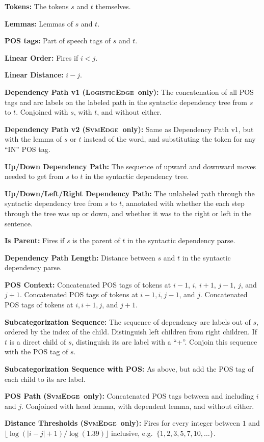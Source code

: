 \documentclass[11pt]{article}
\newcommand{\logitedge}{\textsc{LogisticEdge}}
\newcommand{\svmedge}{\textsc{SvmEdge}}
\begin{document}
\renewcommand{\floatpagefraction}{0.8}
\begin{table}
\begin{framed}
\begin{small}

\textbf{Tokens:} The tokens $s$ and $t$ themselves.

\textbf{Lemmas:} Lemmas of $s$ and $t$.

\textbf{POS tags:} Part of speech tags of $s$ and $t$.

\textbf{Linear Order:} Fires if $i < j$.

\textbf{Linear Distance:} $i - j$.

\textbf{Dependency Path v1 (\logitedge~only):} The concatenation of all POS
tags and arc labels on the labeled path in the syntactic dependency tree from $s$ to
$t$.  Conjoined with $s$, with $t$, and without either.

\textbf{Dependency Path v2 (\svmedge~only):}
Same as Dependency Path v1, but with the lemma of $s$ or $t$ instead of the
word, and substituting the token for any ``IN'' POS tag.

\textbf{Up/Down Dependency Path:} The sequence of upward and
	downward moves needed to get from $s$ to $t$ in the syntactic dependency
	tree.

\textbf{Up/Down/Left/Right Dependency Path:} The unlabeled path through
	the syntactic dependency tree from $s$ to $t$, annotated with whether the each
	step through the tree was up or down, and whether it was to the right or left
	in the sentence.

\textbf{Is Parent:} Fires if  $s$ is the parent of $t$ in the syntactic
	dependency parse.

\textbf{Dependency Path Length:} Distance between $s$ and $t$ in the
	syntactic dependency parse.

\textbf{POS Context:} Concatenated POS tags of tokens at $i-1$, $i$,
	$i+1$, $j-1$, $j$, and $j+1$. Concatenated POS tags of tokens at $i-1, i, j-1$,
	and $j$. Concatenated POS tags of tokens at $i, i+1, j$, and $j+1$.

\textbf{Subcategorization Sequence:} 
	The sequence of dependency arc labels out of $s$, ordered by the index of the
	child.
	Distinguish left children from right children.
	If $t$ is a direct child of $s$, distinguish its arc label with a ``+''.
	Conjoin this sequence with the POS tag of $s$.

\textbf{Subcategorization Sequence with POS:} As above, but add the
	POS tag of each child to its arc label.

\textbf{POS Path (\svmedge~only):}
Concatenated POS tags between and including $i$ and $j$.
Conjoined with head lemma, with dependent lemma, and without either.


\textbf{Distance Thresholds (\svmedge~only):}
Fires for every integer between $1$ and $\lfloor \log(|i-j|+1)/\log(1.39)
\rfloor$ inclusive,
e.g.~$\{1,2,3,5,7,10,\ldots\}$.

\end{small}
\end{framed}
\caption{Features used in edge prediction}
\label{table:edgefeatures}
\end{table}
\end{document}
